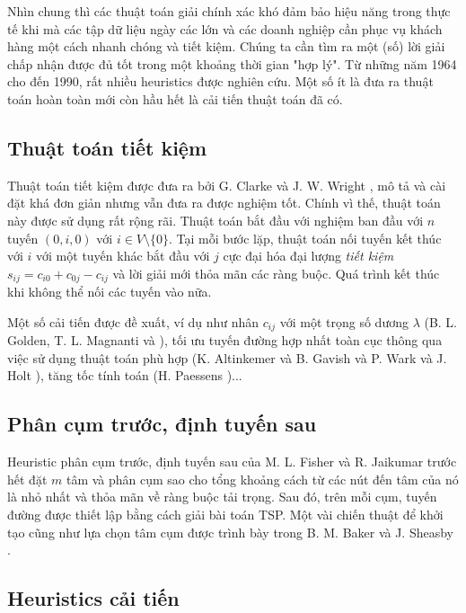 Nhìn chung thì các thuật toán giải chính xác khó đảm bảo hiệu năng trong thực tế khi mà các tập dữ liệu ngày các lớn và các doanh nghiệp cần phục vụ khách hàng một cách nhanh chóng và tiết kiệm. Chúng ta cần tìm ra một (số) lời giải chấp nhận được đủ tốt trong một khoảng thời gian "hợp lý". Từ những năm 1964 cho đến 1990, rất nhiều heuristics được nghiên cứu. Một số ít là đưa ra thuật toán hoàn toàn mới còn hầu hết là cải tiến thuật toán đã có.

\subsection{Thuật toán tiết kiệm}

Thuật toán tiết kiệm được đưa ra bởi G. Clarke và J. W. Wright \cite{clarke1964scheduling}, mô tả và cài đặt khá đơn giản nhưng vẫn đưa ra được nghiệm tốt. Chính vì thế, thuật toán này được sử dụng rất rộng rãi. Thuật toán bắt đầu với nghiệm ban đầu với $n$ tuyến $(0, i, 0)$ với $i \in V \setminus \{0\}$. Tại mỗi bước lặp, thuật toán nối tuyến kết thúc với $i$ với một tuyến khác bắt đầu với $j$ cực đại hóa đại lượng \textit{tiết kiệm} $s_{ij}=c_{i0} + c_{0j} - c_{ij}$ và lời giải mới thỏa mãn các ràng buộc. Quá trình kết thúc khi không thể nối các tuyến vào nữa.

Một số cải tiến được đề xuất, ví dụ như nhân $c_{ij}$ với một trọng số dương $\lambda$ (B. L. Golden, T. L. Magnanti và   \cite{golden1977implementing}), tối ưu tuyến đường hợp nhất toàn cục thông qua việc sử dụng thuật toán phù hợp (K. Altinkemer và B. Gavish \cite{altinkemer1991parallel} và P. Wark và J. Holt \cite{wark1994repeated}), tăng tốc tính toán (H. Paessens \cite{paessens1988savings})...

\subsection{Phân cụm trước, định tuyến sau}

Heuristic phân cụm trước, định tuyến sau của M. L. Fisher và R. Jaikumar \cite{fisher1981generalized} trước hết đặt $m$ tâm và phân cụm sao cho tổng khoảng cách từ các nút đến tâm của nó là nhỏ nhất và thỏa mãn về ràng buộc tải trọng. Sau đó, trên mỗi cụm, tuyến đường được thiết lập bằng cách giải bài toán TSP. Một vài chiến thuật để khởi tạo cũng như lựa chọn tâm cụm được trình bày trong B. M. Baker và J. Sheasby \cite{baker1999extensions}.

\subsection{Heuristics cải tiến}


